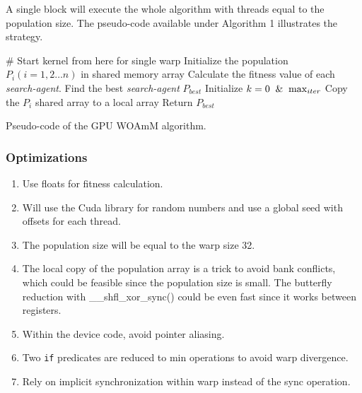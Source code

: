 A single block will execute the whole algorithm with threads equal to
the population size. The pseudo-code available under Algorithm 1
illustrates the strategy.

\begin{algorithm}
\SetAlgoLined
 \# Start kernel from here for single warp\;
 Initialize the population $P_i(i = 1,2\ldots n)$ in shared memory array\;
 Calculate the fitness value of each \textit{search-agent}.\;
 Find the best \textit{search-agent} $P_{best}$\;
 Initialize $k = 0 \And \max_{iter}$\;
 Copy the $P_i$ shared array to a local array\;
 Return $P_{best}$
 \caption{Pseudo-code of the GPU WOAmM algorithm.}
\end{algorithm}

\hypertarget{optimizations}{%
\subsubsection{Optimizations}\label{optimizations}}

\begin{enumerate}
\def\labelenumi{\arabic{enumi}.}
\tightlist
\item
  Use floats for fitness calculation.
\item
  Will use the Cuda library for random numbers and use a global seed
  with offsets for each thread.
\item
  The population size will be equal to the warp size 32.
\item
  The local copy of the population array is a trick to avoid bank
  conflicts, which could be feasible since the population size is small.
  The butterfly reduction with \_\_shfl\_xor\_sync() could be even fast
  since it works between registers.
\item
  Within the device code, avoid pointer aliasing.
\item
  Two \texttt{if} predicates are reduced to min operations to avoid warp
  divergence.
\item
  Rely on implicit synchronization within warp instead of the sync
  operation.
\end{enumerate}


